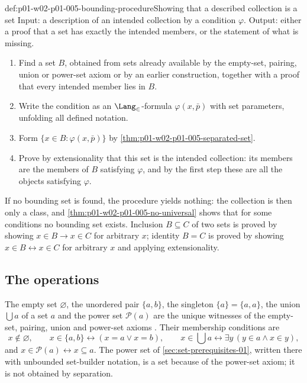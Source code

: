 \begin{hbmethod}{def:p01-w02-p01-005-bounding-procedure}{Showing that a described collection is a set}
Input: a description of an intended collection by a condition \(\varphi\).
Output: either a proof that a set has exactly the intended members, or the
statement of what is missing.
\begin{enumerate}
  \item Find a set \(B\), obtained from sets already available by the
        empty-set, pairing, union or power-set axiom or by an earlier
        construction, together with a proof that every intended member lies in
        \(B\).
  \item Write the condition as an \(\Lang_{\in}\)-formula \(\varphi(x,\bar p)\)
        with set parameters, unfolding all defined notation.
  \item Form \(\{x\in B:\varphi(x,\bar p)\}\) by
        \cref{thm:p01-w02-p01-005-separated-set}.
  \item Prove by extensionality that this set is the intended collection:
        its members are the members of \(B\) satisfying \(\varphi\), and by the
        first step these are all the objects satisfying \(\varphi\).
\end{enumerate}
If no bounding set is found, the procedure yields nothing: the collection is
then only a class, and \cref{thm:p01-w02-p01-005-no-universal} shows that for
some conditions no bounding set exists. Inclusion \(B\subseteq C\) of two sets
is proved by showing \(x\in B\to x\in C\) for arbitrary \(x\); identity
\(B=C\) is proved by showing \(x\in B\leftrightarrow x\in C\) for arbitrary
\(x\) and applying extensionality.
\end{hbmethod}

\subsection{The operations}
\label{sec:p01-w02-p01-005-operations-defs}

The empty set \(\varnothing\), the unordered pair \(\{a,b\}\), the singleton
\(\{a\}=\{a,a\}\), the union \(\bigcup a\) of a set \(a\) and the power set
\(\mathcal P(a)\) are the unique witnesses of the empty-set, pairing, union and
power-set axioms \cite[ch.~``The Axioms of ZF and ZFC'', definitions ``Empty
set'' and ``Pairing, union, and power set'']{FrozenFormalLogicSetOperations}.
Their membership conditions are
\[
  x\notin\varnothing,\qquad
  x\in\{a,b\}\leftrightarrow(x=a\lor x=b),\qquad
  x\in\textstyle\bigcup a\leftrightarrow\exists y\,(y\in a\land x\in y),
\]
and \(x\in\mathcal P(a)\leftrightarrow x\subseteq a\). The power set of
\cref{sec:set-prerequisites-01}, written there with unbounded set-builder
notation, is a set because of the power-set axiom; it is not obtained by
separation.

